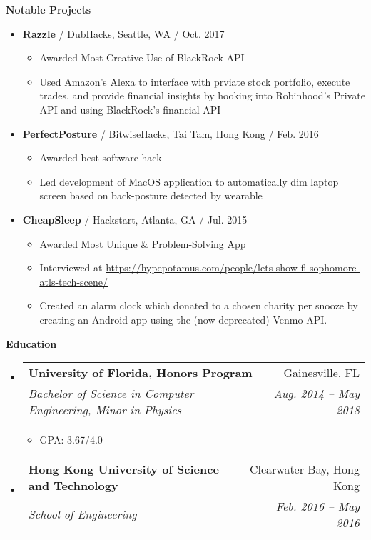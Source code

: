 \documentclass[letterpaper,10pt]{article}
\makeatletter
\newcommand{\resitem}[1]{\item #1 \vspace{-3pt}}
\newcommand{\resheading}[1]{{\large \colorbox{mygrey}{\begin{minipage}{\textwidth}{\textbf{#1 \vphantom{p\^{E}}}}\end{minipage}}}}
\newcommand{\ressubheading}[4]{
\begin{tabular*}{7.0in}{l@{\extracolsep{\fill}}r}
		\textbf{#1} & #2 \\
		\textit{#3} & \textit{#4} \\
\end{tabular*}\vspace{-6pt}}
\newcommand{\singlesubheading}[3]{ \textbf{#1} / #2 / #3 \vspace{-2pt}}
\makeatother
\begin{document}
\resheading{Notable Projects}
\begin{itemize}
\item[]
	\singlesubheading{Razzle}{DubHacks, Seattle, WA}{Oct. 2017}
    \begin{itemize}
        \resitem{Awarded Most Creative Use of BlackRock API}
		\resitem{Used Amazon's Alexa to interface with prviate stock portfolio, execute trades, and provide financial insights by hooking into Robinhood's Private API and using BlackRock's financial API}
	\end{itemize}
\item[]
	\singlesubheading{PerfectPosture}{BitwiseHacks, Tai Tam, Hong Kong}{Feb. 2016}
    \begin{itemize}
        \resitem{Awarded best software hack}
		\resitem{Led development of MacOS application to automatically dim laptop screen based on back-posture detected by wearable}
    \end{itemize}
\item[]
    \singlesubheading{CheapSleep}{Hackstart, Atlanta, GA}{Jul. 2015}
    \begin{itemize}
        \resitem{Awarded Most Unique \& Problem-Solving App}
        \resitem{Interviewed at \underline{\href{https://hypepotamus.com/people/lets-show-fl-sophomore-atls-tech-scene/}{https://hypepotamus.com/people/lets-show-fl-sophomore-atls-tech-scene/}}}
		\resitem{Created an alarm clock which donated to a chosen charity per snooze by creating an Android app using the (now deprecated) Venmo API.}
	\end{itemize}
\end{itemize}
    
\resheading{Education}
    \begin{itemize}
    \item[]
        \ressubheading{University of Florida, Honors Program}{Gainesville, FL}{Bachelor of Science in Computer Engineering, Minor in Physics}{Aug. 2014 -- May 2018}
        \begin{itemize}
            \resitem{GPA: 3.67/4.0}
        \end{itemize}
    
    \item[]
        \ressubheading{Hong Kong University of Science and Technology}{Clearwater Bay, Hong Kong}{School of Engineering}{Feb. 2016 -- May 2016}
    \end{itemize}
\end{document}
